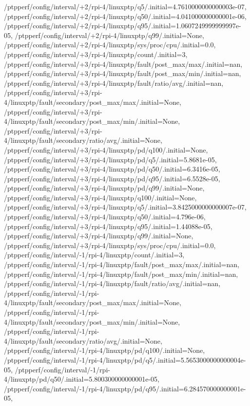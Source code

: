 {    /ptpperf/config/interval/+2/rpi-4/linuxptp/q5/.initial=4.7610000000000003e-07,
    /ptpperf/config/interval/+2/rpi-4/linuxptp/q50/.initial=4.041000000000001e-06,
    /ptpperf/config/interval/+2/rpi-4/linuxptp/q95/.initial=1.0607249999999997e-05,
    /ptpperf/config/interval/+2/rpi-4/linuxptp/q99/.initial=None,
    /ptpperf/config/interval/+2/rpi-4/linuxptp/sys/proc/cpu/.initial=0.0,
    /ptpperf/config/interval/+3/rpi-4/linuxptp/count/.initial=3,
    /ptpperf/config/interval/+3/rpi-4/linuxptp/fault/post_max/max/.initial=nan,
    /ptpperf/config/interval/+3/rpi-4/linuxptp/fault/post_max/min/.initial=nan,
    /ptpperf/config/interval/+3/rpi-4/linuxptp/fault/ratio/avg/.initial=nan,
    /ptpperf/config/interval/+3/rpi-4/linuxptp/fault/secondary/post_max/max/.initial=None,
    /ptpperf/config/interval/+3/rpi-4/linuxptp/fault/secondary/post_max/min/.initial=None,
    /ptpperf/config/interval/+3/rpi-4/linuxptp/fault/secondary/ratio/avg/.initial=None,
    /ptpperf/config/interval/+3/rpi-4/linuxptp/pd/q100/.initial=None,
    /ptpperf/config/interval/+3/rpi-4/linuxptp/pd/q5/.initial=5.8681e-05,
    /ptpperf/config/interval/+3/rpi-4/linuxptp/pd/q50/.initial=6.3416e-05,
    /ptpperf/config/interval/+3/rpi-4/linuxptp/pd/q95/.initial=6.5528e-05,
    /ptpperf/config/interval/+3/rpi-4/linuxptp/pd/q99/.initial=None,
    /ptpperf/config/interval/+3/rpi-4/linuxptp/q100/.initial=None,
    /ptpperf/config/interval/+3/rpi-4/linuxptp/q5/.initial=3.8425000000000007e-07,
    /ptpperf/config/interval/+3/rpi-4/linuxptp/q50/.initial=4.796e-06,
    /ptpperf/config/interval/+3/rpi-4/linuxptp/q95/.initial=1.44088e-05,
    /ptpperf/config/interval/+3/rpi-4/linuxptp/q99/.initial=None,
    /ptpperf/config/interval/+3/rpi-4/linuxptp/sys/proc/cpu/.initial=0.0,
    /ptpperf/config/interval/-1/rpi-4/linuxptp/count/.initial=3,
    /ptpperf/config/interval/-1/rpi-4/linuxptp/fault/post_max/max/.initial=nan,
    /ptpperf/config/interval/-1/rpi-4/linuxptp/fault/post_max/min/.initial=nan,
    /ptpperf/config/interval/-1/rpi-4/linuxptp/fault/ratio/avg/.initial=nan,
    /ptpperf/config/interval/-1/rpi-4/linuxptp/fault/secondary/post_max/max/.initial=None,
    /ptpperf/config/interval/-1/rpi-4/linuxptp/fault/secondary/post_max/min/.initial=None,
    /ptpperf/config/interval/-1/rpi-4/linuxptp/fault/secondary/ratio/avg/.initial=None,
    /ptpperf/config/interval/-1/rpi-4/linuxptp/pd/q100/.initial=None,
    /ptpperf/config/interval/-1/rpi-4/linuxptp/pd/q5/.initial=5.5653000000000004e-05,
    /ptpperf/config/interval/-1/rpi-4/linuxptp/pd/q50/.initial=5.800300000000001e-05,
    /ptpperf/config/interval/-1/rpi-4/linuxptp/pd/q95/.initial=6.284570000000001e-05,
}
